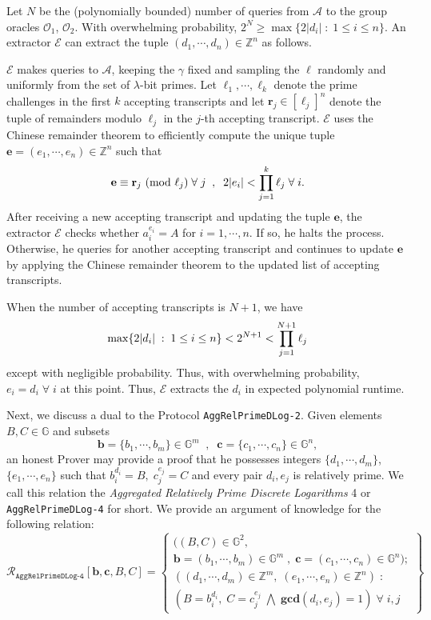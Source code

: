 \documentclass[11pt, lettersize, notitlepage, leqno, footskip=0.6cm]{article}
\newcommand{\bz}{\mathbb Z}
\newcommand{\pl}{\prod\limits}
\newcommand{\ttt}{\texttt}
\newcommand{\mc}{\mathcal}
\newcommand{\mb}{\mathbb}
\newcommand{\mbf}{\mathbf}
\newcommand{\lam}{\lambda}
\newcommand{\A}{\mc{A}}
\newcommand{\vs}{\vspace{-0.15cm}}
\newcommand{\op}{overwhelming probability}
\newcommand{\np}{negligible probability}
\newcommand{\Mod}[1]{\ (\mathrm{mod}\ #1)}
\newcommand{\GCD}{\mbf{gcd}}
\newcommand{\E}{\mc{E}}
\numberwithin{equation}{section}
\begin{document}
\begin{prf}
Let $N$ be the (polynomially bounded) number of queries from $\A$ to the group oracles $\mc{O}_1$, $\mc{O}_2$. With \op, $2^{N} \geq \max\{2|d_i|\;:\;1\leq i\leq n \}$. An extractor $\E$ can extract the tuple $(d_1,\cdots,d_n)\in\bz^n$ as follows. 

$\E$ makes queries to $\A$, keeping the $\gamma$ fixed and sampling the $\ell$ randomly and uniformly from the set of $\lam$-bit primes. Let $\ell_1,\cdots,\ell_{k}$ denote the prime challenges in the first $k$ accepting transcripts and let $\mbf{r}_j\in [\ell_j]^n$ denote the tuple of remainders modulo $\ell_j$ in the $j$-th accepting transcript. $\E$ uses the Chinese remainder theorem to efficiently compute the unique tuple $\mbf{e} = (e_1,\cdots,e_n)\in \bz^n$ such that \vs $$\mbf{e}\equiv \mbf{r}_j\Mod{\ell_j}\;\forall\; j\;\;,\;\;2|e_i|< \pl_{j=1}^{k} \ell_j\;\forall\; i.\vs $$ After receiving a new accepting transcript and updating the tuple $\mbf{e}$, the extractor $\E$ checks whether $a_i^{e_i} = A$ for $i=1,\cdots,n$. If so, he halts the process. Otherwise, he queries for another accepting transcript and continues to update $\mbf{e}$ by applying the Chinese remainder theorem to the updated list of accepting transcripts.

When the number of accepting transcripts is $N+1$, we have \vs $$\max\{2|d_i|\;:\;1\leq i\leq n \} < 2^{N+1} < \pl_{j=1}^{N+1}\ell_j \vs $$ except with \np. Thus, with \op, $e_i = d_i\;\forall\;i$ at this point. Thus, $\E$ extracts the $d_i$ in expected polynomial runtime. \end{prf}



\bigskip

Next, we discuss a dual to the Protocol \verb|AggRelPrimeDLog-2|. Given elements $B, C\in \mb{G}$ and subsets \vspace{-0.15cm}$$\mbf{b} = \{b_1,\cdots, b_m\}\in \mb{G}^m \;\;,\;\; \mbf{c} = \{c_1,\cdots, c_n\}\in \mb{G}^n,$$ an honest Prover may provide a proof that he possesses integers $\{d_1,\cdots, d_m\}$, $\{e_1,\cdots, e_n\}$ such that $b_i^{d_i} = B,\; c_j^{e_j} = C$ and every pair $d_i, e_j$ is relatively prime. We call this relation the \textit{Aggregated Relatively Prime Discrete Logarithms} 4 or \verb|AggRelPrimeDLog-4| for short. We provide an argument of knowledge for the following relation:
\[
  \mc{R}_{\ttt{AggRelPrimeDLog-4}}[\mbf{b}, \mbf{c}, B, C] = \left\{\begin{array}{l}
    ((B,C)\in\mb{G}^2,\;\\
     \mbf{b} = (b_1,\cdots,b_m)\in\mb{G}^m\;,\;\mbf{c} = (c_1,\cdots, c_n)\in\mb{G}^n);\\
    ((d_1,\cdots,d_m)\in\bz^m,\; (e_1,\cdots,e_n)\in\bz^n)\;: \\
    (B = b_i^{d_i},\; C = c_j^{e_j}\;\bigwedge \; \GCD(d_i, e_j) = 1)\;\forall \;i,j
  \end{array}\right\}
\] 
\end{document}
